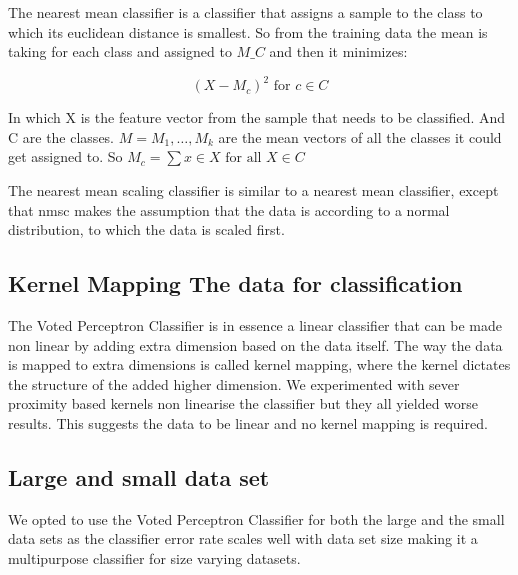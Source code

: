 \documentclass[%
        compressed,
        final,
        notitlepage,
        narroweqnarray,
        inline,
        twoside,
        ]{ieee}
\begin{document}
The nearest mean classifier is a classifier that assigns a sample to the class
to which its euclidean distance is smallest. So from the training data the mean
is taking for each class and assigned to $M\_C$ and then it minimizes:

\begin{equation}
    (X - M_c)^2 \text{ for $c \in C$}
\end{equation}

In which X is the feature vector from the sample that needs to be classified.
And C are the classes. $M = {M_1, …, M_k}$ are the mean vectors of all the classes
it could get assigned to.
So $M_c = \sum{x \in X \text{ for all $X \in C$}}$

The nearest mean scaling classifier is similar to a nearest mean classifier,
except that nmsc makes the assumption that the data is according to a normal
distribution, to which the data is scaled first.

\subsection{Kernel Mapping The data for classification}
The Voted Perceptron Classifier is in essence a linear classifier that can be made non linear by adding extra dimension based on the data itself. The way the data is mapped to extra dimensions is called kernel mapping, where the kernel dictates the structure of the added higher dimension. We experimented with sever proximity based kernels non linearise the classifier but they all yielded worse results. This suggests the data to be linear and no kernel mapping is required.

\subsection{Large and small data set}
We opted to use the Voted Perceptron Classifier for both the large and the small data sets as the classifier error rate scales well with data set size making it a multipurpose classifier for size varying datasets.

\end{document}

